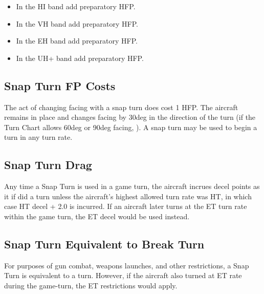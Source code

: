 \begin{advancedrules}
{        \begin{itemize}
            \item In the HI band add  preparatory HFP.
            \item In the VH band add  preparatory HFP.
            \item In the EH band add  preparatory HFP.
            \item In the UH+ band add  preparatory HFP.
        \end{itemize}

        \subsection{Snap Turn FP Costs} The act of changing facing with a snap turn does cost 1 HFP.  The aircraft remains in place and changes facing by 30{deg} in the direction of the turn (if the Turn Chart allows 60{deg} or 90{deg} facing, ). A snap turn may be used to begin a turn in any turn rate.

        \subsection{Snap Turn Drag} Any time a Snap Turn is used in a game turn, the aircraft incrues decel points as it if did a  turn unless the aircraft's highest allowed turn rate was HT, in which case HT decel + 2.0 is incurred. If an aircraft later turns at the ET turn rate within the game turn, the ET decel would be used instead.

        \subsection{Snap Turn Equivalent to Break Turn} For purposes of gun combat, weapons launches, and other restrictions, a Snap Turn is equivalent to a  turn. However, if the aircraft also turned at ET rate during the game-turn, the ET restrictions would apply.
    }


\end{advancedrules}
